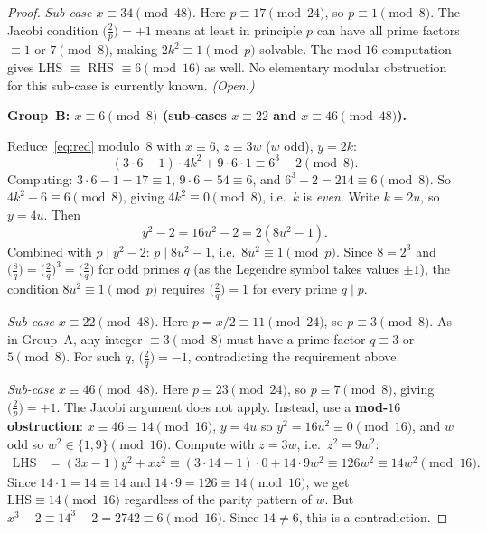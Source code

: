 \documentclass[12pt,a4paper]{article}
\theoremstyle{definition}
\begin{document}
\begin{proof}
\textit{Sub-case $x\equiv 34\pmod{48}$.}
Here $p \equiv 17\pmod{24}$, so $p \equiv 1\pmod{8}$.
The Jacobi condition $\bigl(\frac{2}{p}\bigr) = +1$ means at least
in principle $p$ can have all prime factors $\equiv 1$ or $7\pmod{8}$,
making $2k^2 \equiv 1\pmod{p}$ solvable.  The mod-$16$ computation gives
LHS $\equiv$ RHS $\equiv 6\pmod{16}$ as well.  No elementary modular
obstruction for this sub-case is currently known.  \emph{(Open.)}

\medskip\noindent
\textbf{Group~B: $x \equiv 6\pmod{8}$
  (sub-cases $x \equiv 22$ and $x \equiv 46\pmod{48}$).}

Reduce~\eqref{eq:red} modulo~$8$ with $x \equiv 6$, $z \equiv 3w$ ($w$ odd),
$y = 2k$:
\[
  (3\cdot 6-1)\cdot 4k^2 + 9\cdot 6\cdot 1 \equiv 6^3-2 \pmod8.
\]
Computing: $3\cdot6-1=17\equiv 1$, $9\cdot6=54\equiv 6$, and
$6^3-2=214\equiv 6\pmod 8$.  So $4k^2 + 6 \equiv 6\pmod8$, giving
$4k^2 \equiv 0\pmod 8$, i.e.\ $k$ is \emph{even}.  Write $k = 2u$,
so $y = 4u$.  Then
\[
  y^2-2 = 16u^2 - 2 = 2(8u^2-1).
\]
Combined with $p \mid y^2-2$: $p \mid 8u^2-1$, i.e.\ $8u^2 \equiv
1\pmod{p}$.  Since $8 = 2^3$ and $\bigl(\frac{8}{q}\bigr) =
\bigl(\frac{2}{q}\bigr)^3 = \bigl(\frac{2}{q}\bigr)$ for odd primes $q$
(as the Legendre symbol takes values $\pm 1$), the condition $8u^2 \equiv
1\pmod{p}$ requires $\bigl(\frac{2}{q}\bigr) = 1$ for every prime $q \mid p$.

\textit{Sub-case $x\equiv 22\pmod{48}$.}
Here $p = x/2 \equiv 11\pmod{24}$, so $p \equiv 3\pmod{8}$.  As in Group~A,
any integer $\equiv 3\pmod{8}$ must have a prime factor $q \equiv 3$ or
$5\pmod{8}$.  For such $q$, $\bigl(\frac{2}{q}\bigr) = -1$, contradicting
the requirement above.

\textit{Sub-case $x\equiv 46\pmod{48}$.}
Here $p \equiv 23\pmod{24}$, so $p \equiv 7\pmod{8}$, giving
$\bigl(\frac{2}{p}\bigr) = +1$.  The Jacobi argument does not apply.
Instead, use a \textbf{mod-$16$ obstruction}:
$x \equiv 46 \equiv 14\pmod{16}$, $y = 4u$ so $y^2 = 16u^2 \equiv
0\pmod{16}$, and $w$ odd so $w^2 \in \{1,9\}\pmod{16}$.  Compute with
$z = 3w$, i.e.\ $z^2 = 9w^2$:
\begin{align*}
  \mathrm{LHS} &= (3x-1)y^2 + xz^2
  \equiv (3\cdot 14-1)\cdot 0 + 14\cdot 9w^2
  \equiv 126 w^2 \equiv 14 w^2\pmod{16}.
\end{align*}
Since $14\cdot 1 = 14 \equiv 14$ and $14\cdot 9 = 126 \equiv 14\pmod{16}$,
we get $\mathrm{LHS} \equiv 14\pmod{16}$ regardless of the parity pattern
of $w$.  But $x^3-2 \equiv 14^3-2 = 2742 \equiv 6\pmod{16}$.
Since $14 \neq 6$, this is a contradiction.
\end{proof}
\end{document}

